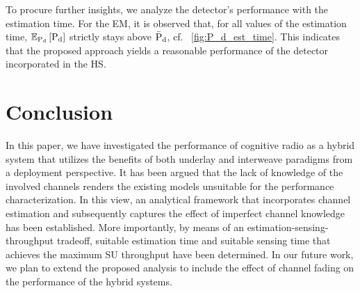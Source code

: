 %
To procure further insights, we analyze the detector's performance with the estimation time. For the EM, it is observed that, for all values of the estimation time, ${\mathbb E}_{\text{P}_{\text{d}}}\left[ \text{P}_{\text{d}} \right]$ strictly stays above $\bar{\text{P}}_{\text{d}}$, cf. \figurename~\ref{fig:P_d_est_time}. This indicates that the proposed approach yields a reasonable performance of the detector incorporated in the HS. %

\section{Conclusion} \label{sec:conc}
In this paper, we have investigated the performance of cognitive radio as a hybrid system that utilizes the benefits of both underlay and interweave paradigms from a deployment perspective. It has been argued that the lack of knowledge of the involved channels renders the existing models unsuitable for the performance characterization. In this view, an analytical framework that incorporates channel estimation and subsequently captures the effect of imperfect channel knowledge has been established. More importantly, by means of an estimation-sensing-throughput tradeoff, suitable estimation time and suitable sensing time that achieves the maximum SU throughput have been determined. In our future work, we plan to extend the proposed analysis to include the effect of channel fading on the performance of the hybrid systems. 

